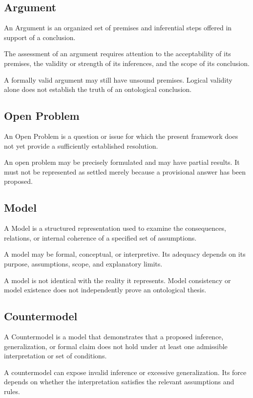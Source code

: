 \subsection*{Argument}

An Argument is an organized set of premises and inferential steps
offered in support of a conclusion.

The assessment of an argument requires attention to the acceptability
of its premises, the validity or strength of its inferences, and
the scope of its conclusion.

A formally valid argument may still have unsound premises. Logical
validity alone does not establish the truth of an ontological conclusion.


\subsection*{Open Problem}

An Open Problem is a question or issue for which the present framework
does not yet provide a sufficiently established resolution.

An open problem may be precisely formulated and may have partial
results. It must not be represented as settled merely because
a provisional answer has been proposed.


\subsection*{Model}

A Model is a structured representation used to examine the consequences,
relations, or internal coherence of a specified set of assumptions.

A model may be formal, conceptual, or interpretive. Its adequacy
depends on its purpose, assumptions, scope, and explanatory limits.

A model is not identical with the reality it represents. Model
consistency or model existence does not independently prove an
ontological thesis.


\subsection*{Countermodel}

A Countermodel is a model that demonstrates that a proposed inference,
generalization, or formal claim does not hold under at least one
admissible interpretation or set of conditions.

A countermodel can expose invalid inference or excessive generalization.
Its force depends on whether the interpretation satisfies the
relevant assumptions and rules.

